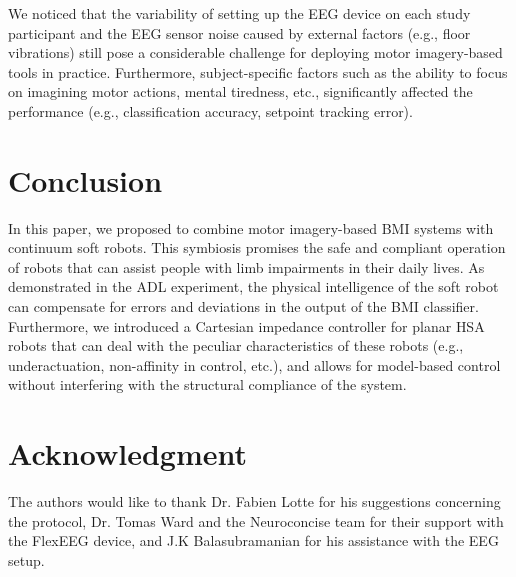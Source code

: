 \documentclass[letterpaper, 10pt, conference]{ieeeconf}      %
\begin{document}
We noticed that the variability of setting up the \gls{EEG} device on each study participant and the \gls{EEG} sensor noise caused by external factors (e.g., floor vibrations) still pose a considerable challenge for deploying motor imagery-based tools in practice. Furthermore, subject-specific factors such as the ability to focus on imagining motor actions, mental tiredness, etc., significantly affected the performance (e.g., classification accuracy, setpoint tracking error).

\section{Conclusion}
In this paper, we proposed to combine motor imagery-based \gls{BMI} systems with continuum soft robots. This symbiosis promises the safe and compliant operation of robots that can assist people with limb impairments in their daily lives.
As demonstrated in the \gls{ADL} experiment, the physical intelligence of the soft robot can compensate for errors and deviations in the output of the \gls{BMI} classifier.
Furthermore, we introduced a Cartesian impedance controller for planar \gls{HSA} robots that can deal with the peculiar characteristics of these robots (e.g., underactuation, non-affinity in control, etc.), and allows for model-based control without interfering with the structural compliance of the system.


\section*{Acknowledgment}
The authors would like to thank Dr. Fabien Lotte for his suggestions concerning the protocol, Dr. Tomas Ward and the Neuroconcise team for their support with the FlexEEG device, and J.K Balasubramanian for his assistance with the EEG setup.



\end{document}

